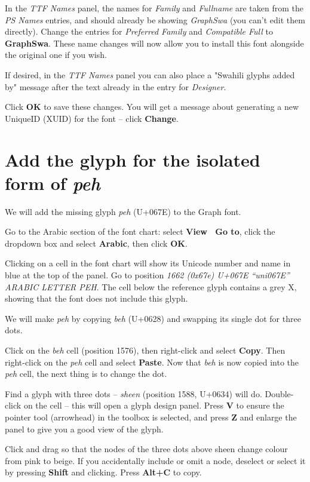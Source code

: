 In the \textit{TTF Names} panel, the names for \textit{Family} and \textit{Fullname} are taken from the \textit{PS Names} entries, and should already be showing \textit{GraphSwa} (you can't edit them directly).  Change the entries for \textit{Preferred Family} and \textit{Compatible Full} to \textbf{GraphSwa}.  These name changes will now allow you to install this font alongside the original one if you wish.

If desired, in the \textit{TTF Names} panel you can also place a "Swahili glyphs added by" message after the text already in the entry for \textit{Designer}.

Click \textbf{OK} to save these changes.  You will get a message about generating a new UniqueID (XUID) for the font -- click \textbf{Change}.

\section{Add the glyph for the isolated form of \textit{peh}}
\label{s:pehisol}

We will add the missing glyph \textit{peh} (U+067E) to the Graph font.

Go to the Arabic section of the font chart: select \textbf{View \textrightarrow\ Go to}, click the dropdown box and select \textbf{Arabic}, then click \textbf{OK}.

Clicking on a cell in the font chart will show its Unicode number and name in blue at the top of the panel.  Go to position \textit{1662 (0x67e) U+067E ``uni067E'' ARABIC LETTER PEH}.  The cell below the reference glyph contains a grey X, showing that the font does not include this glyph.

We will make \textit{peh} by copying \textit{beh} (U+0628) and swapping its single dot for three dots.

Click on the \textit{beh} cell (position 1576), then right-click and select \textbf{Copy}.  Then right-click on the \textit{peh} cell and select \textbf{Paste}.  Now that \textit{beh} is now copied into the \textit{peh} cell, the next thing is to change the dot.

Find a glyph with three dots -- \textit{sheen} (position 1588, U+0634) will do.  Double-click on the cell -- this will open a glyph design panel.  Press \textbf{V} to ensure the pointer tool (arrowhead) in the toolbox is selected, and press \textbf{Z} and enlarge the panel to give you a good view of the glyph.

Click and drag so that the nodes of the three dots above sheen change colour from pink to beige.  If you accidentally include or omit a node, deselect or select it by pressing \textbf{Shift} and clicking.  Press \textbf{Alt+C} to copy.

